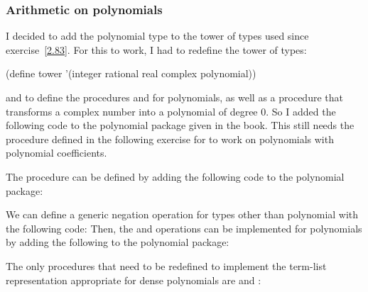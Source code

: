\subsubsection{Arithmetic on polynomials}

\begin{comp}
    I decided to add the polynomial type to the tower of types used since 
    exercise~\ref{2.83}. For this to work, I had to redefine the tower of types:
    \begin{cscm}
        (define tower '(integer rational real complex polynomial))
    \end{cscm}
    and to define the procedures  and  for polynomials, 
    as well as a  procedure that transforms a complex number into 
    a polynomial of degree 0. So I added the following code to the polynomial 
    package given in the book. This still needs the  procedure 
    defined in the following exercise for  to work on polynomials 
    with polynomial coefficients.
\end{comp}

\begin{exe}[2.87]
    The  procedure can be defined by adding the following code to 
    the polynomial package:
\end{exe}

\begin{exe}[2.88]
    We can define a generic negation operation  for types other than 
    polynomial with the following code:
    Then, the  and  operations can be implemented for 
    polynomials by adding the following to the polynomial package:
\end{exe}

\begin{exe}[2.89]
    The only procedures that need to be redefined to implement the term-list 
    representation appropriate for dense polynomials are  and 
    :
\end{exe}

